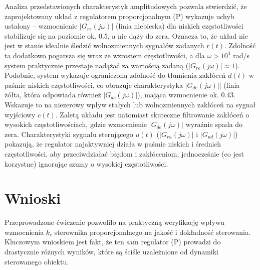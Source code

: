 \documentclass[12pt,a4paper]{article}
\begin{document}
		Analiza przedstawionych charakterystyk amplitudowych pozwala stwierdzić, że zaprojektowany układ z regulatorem proporcjonalnym (P) wykazuje uchyb ustalony – wzmocnienie $|G_{re}(j\omega)|$ (linia niebieska) dla niskich częstotliwości stabilizuje się na poziomie ok. 0.5, a nie dąży do zera. Oznacza to, że układ nie jest w stanie idealnie śledzić wolnozmiennych sygnałów zadanych $r(t)$. Zdolność ta dodatkowo pogarsza się wraz ze wzrostem częstotliwości, a dla $\omega > 10^4$ rad/s system praktycznie przestaje nadążać za wartością zadaną ($|G_{re}(j\omega)| \approx 1$). Podobnie, system wykazuje ograniczoną zdolność do tłumienia zakłóceń $d(t)$ w paśmie niskich częstotliwości, co obrazuje charakterystyka $|G_{de}(j\omega)|$| (linia żółta, która odpowiada również $|G_{dc}(j\omega)|$), mająca wzmocnienie ok. 0.43. Wskazuje to na niezerowy wpływ stałych lub wolnozmiennych zakłóceń na sygnał wyjściowy $c(t)$. Zaletą układu jest natomiast skuteczne filtrowanie zakłóceń o wysokich częstotliwościach, gdzie wzmocnienie $|G_{de}(j\omega)|$ wyraźnie spada do zera. Charakterystyki sygnału sterującego $u(t)$ ($|G_{ru}(j\omega)|$ i $|G_{ud}(j\omega)|$) pokazują, że regulator najaktywniej działa w paśmie niskich i średnich częstotliwości, aby przeciwdziałać błędom i zakłóceniom, jednocześnie (co jest korzystne) ignorując szumy o wysokiej częstotliwości.
			
	\section{Wnioski}
	Przeprowadzone ćwiczenie pozwoliło na praktyczną weryfikację wpływu wzmocnienia $k_c$ sterownika proporcjonalnego na jakość i dokładność sterowania. Kluczowym wnioskiem jest fakt, że ten sam regulator (P) prowadzi do drastycznie różnych wyników, które są ściśle uzależnione od dynamiki sterowanego obiektu.
	
\end{document}
